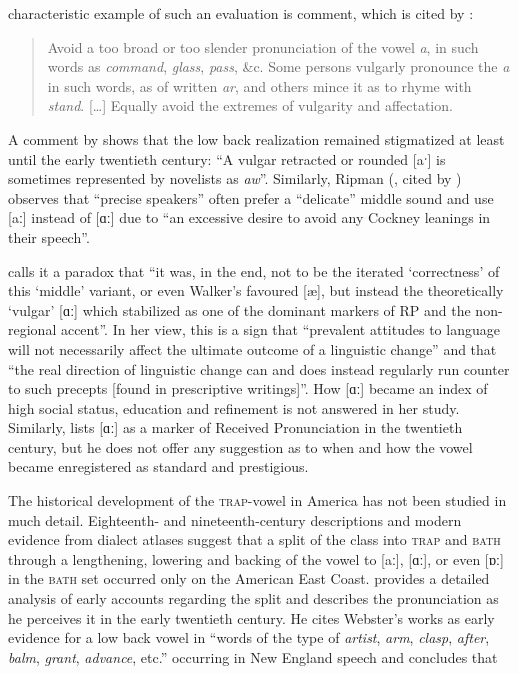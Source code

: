 characteristic example of such an evaluation is  comment, which is cited by \citet[83]{Mugglestone2003}:

\begin{quote}
Avoid a too broad or too slender pronunciation of the vowel \emph{a}, in such words as \emph{command}, \emph{glass}, \emph{pass}, \&c. Some persons vulgarly pronounce the \emph{a} in such words, as of written \emph{ar}, and others mince it as to rhyme with \emph{stand}. […] Equally avoid the extremes of vulgarity and affectation.
\end{quote}


A comment by \citet[428]{Jespersen19091948} shows that the low back realization remained stigmatized at least until the early twentieth century: “A vulgar retracted or rounded [aˑ] is sometimes represented by novelists as \emph{aw}”. Similarly, Ripman (\citeyear[55]{Ripman1906}, cited by \citealt[88]{Mugglestone2003}) observes that “precise speakers” often prefer a “delicate” middle sound and use [aː] instead of [ɑː] due to “an excessive desire to avoid any Cockney leanings in their speech”.


\citet[83]{Mugglestone2003} calls it a paradox that “it was, in the end, not to be the iterated ‘correctness' of this ‘middle' variant, or even Walker's favoured [æ], but instead the theoretically ‘vulgar' [ɑː] which stabilized as one of the dominant markers of RP and the non-regional accent”. In her view, this is a sign that “prevalent attitudes to language will not necessarily affect the ultimate outcome of a linguistic change” and that “the real direction of linguistic change can and does instead regularly run counter to such precepts [found in prescriptive writings]”. How [ɑː] became an index of high social status, education and refinement is not answered in her study. Similarly, \citet{Agha2003} lists [ɑː] as a marker of Received Pronunciation in the twentieth century, but he does not offer any suggestion as to when and how the vowel became enregistered as standard and prestigious.

The historical development of the \textsc{trap}{}-vowel in America has not been studied in much detail. Eighteenth- and nineteenth-century descriptions and modern evidence from dialect atlases suggest that a split of the class into \textsc{trap} and \textsc{bath} through a lengthening, lowering and backing of the vowel to [aː], [ɑː], or even [ɒː] in the \textsc{bath} set occurred only on the American East Coast. \citet{Krapp19252} provides a detailed analysis of early accounts regarding the split and describes the pronunciation as he perceives it in the early twentieth century. He cites Webster’s works as early evidence for a low back vowel in “words of the type of \emph{artist}, \emph{arm}, \emph{clasp}, \emph{after}, \emph{balm}, \emph{grant}, \emph{advance}, etc.” occurring in New England speech \citep[63]{Krapp19252} and concludes that

